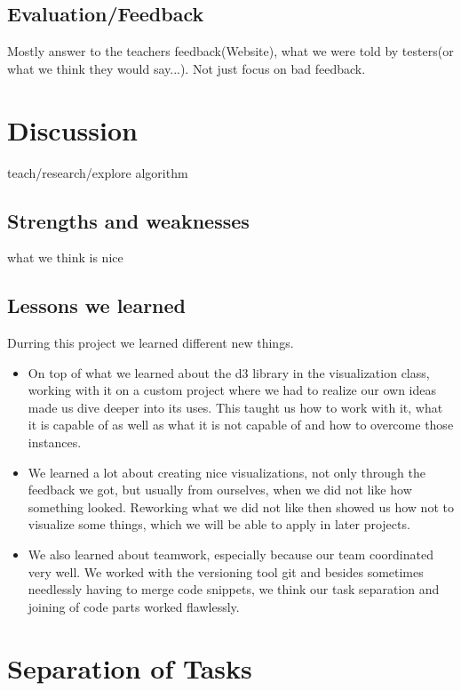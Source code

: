 \documentclass{vgtc}                          %
\begin{document}
\subsection{Evaluation/Feedback}
Mostly answer to the teachers feedback(Website), what we were told by testers(or what we think they would say...). Not just focus on bad feedback.

\section{Discussion}

teach/research/explore algorithm

\subsection{Strengths and weaknesses}
what we think is nice
\subsection{Lessons we learned}
\begin{flushleft}
Durring this project we learned different new things.
\end{flushleft}
\begin{itemize}
\item On top of what we learned about the d3 library in the visualization class, working with it on a custom project where we had to realize our own ideas made us dive deeper into its uses. This taught us how to work with it, what it is capable of as well as what it is not capable of and how to overcome those instances.
\item We learned a lot about creating nice visualizations, not only through the feedback we got, but usually from ourselves, when we did not like how something looked. Reworking what we did not like then showed us how not to visualize some things, which we will be able to apply in later projects.
\item We also learned about teamwork, especially because our team coordinated very well. We worked with the versioning tool git and besides sometimes needlessly having to merge code snippets, we think our task separation and joining of code parts worked flawlessly.
\end{itemize}

\section{Separation of Tasks}
\end{document}
